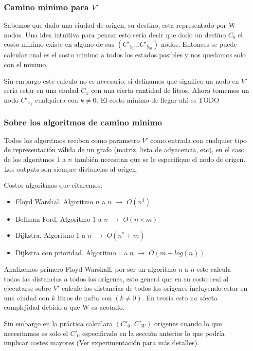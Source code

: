 \documentclass[12pt]{article}
\begin{document}
\subsubsection{Camino minimo para $V'$}

Sabemos que dado una ciudad de origen, su destino, esta representado por W nodos. Una idea intuitiva para pensar esto sería decir que dado un destino $C_b$ el costo minimo existe en alguno de sus $(C'_{b_0}...C'_{b_{60}})$ nodos. Entonces se puede calcular cual es el costo minimo a todos los estados posibles y nos quedamos solo con el minimo.

Sin embargo este calculo no es necesario, si definamos que significa un nodo en $V'$ sería estar en una ciudad $C_x$ con una cierta cantidad de litros. Ahora tomemos un nodo $C'_ {x_k}$ cualquiera con $k \neq 0$. El costo minimo de llegar ahí es TODO

\subsubsection{Sobre los algoritmos de camino minimo}

Todos los algoritmos reciben como parametro $V'$ como entrada con cualquier tipo de representación válida de un grafo (matriz, lista de adyacencia, etc), en el caso de los algoritmos $1$ a $n$ también necesitan que se le especifique el nodo de origen. Los outputs son siempre distancias al origen.

Costos algoritmos que citaremos:
\begin{itemize}
	\item Floyd Warshal. Algoritmo $n$ a $n$ $\rightarrow$  $O(n^3)$
	\item Bellman Ford. Algoritmo $1$ a $n$ $\rightarrow$ $O(n \times m)$
	\item Dijkstra. Algoritmo $1$ a $n$ $\rightarrow$ $O(n^2+m)$
	\item Dijkstra con prioridad. Algoritmo $1$ a $n$ $\rightarrow$  $O(m + log (n))$
\end{itemize}

Analizemos primero Floyd Warshall, por ser un algoritmo $n$ a $n$ este calcula todas las distancias a todos los origenes, esto generá que en su costo real al ejecutarse sobre $V'$ calcule las distancias de todos los origenes incluyendo estar en una ciudad con $k$ litros de nafta con $(k \neq 0)$. En teoría esto no afecta complejidad debido a que W es acotado.

Sin embargo en la práctica calculara $(C'_0..C'_W)$ origenes cuando lo que necesitamos es solo el $C'_0$ especificado en la sección anterior lo que podría implicar costes mayores (Ver experimentación para más detalles).
\end{document}
